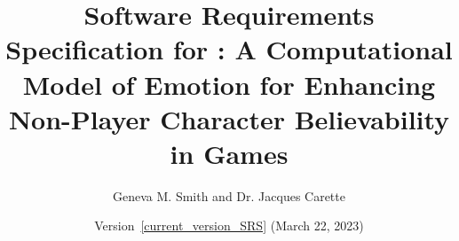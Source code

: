 \documentclass[11pt, titlepage]{article}
\begin{document}
    \setcounter{pages}{\totalpages}

    \begin{titlepage}
        \thispagestyle{empty}

        \title{Software Requirements Specification for \progname{}: A
        Computational Model of Emotion for Enhancing Non-Player Character
        Believability in Games}
        \author{Geneva M. Smith and Dr. Jacques Carette}
        \date{Version~\ref{current_version_SRS} (March 22, 2023)}

        \maketitle
    \end{titlepage}

    \pagestyle{fancy}

    \vspace*{\fill}
\end{document}
